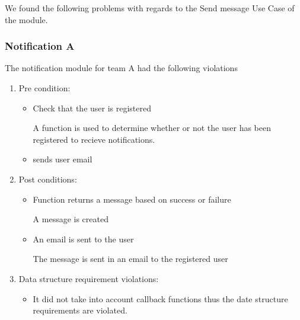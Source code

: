 
 We found the following problems with regards to the Send message Use Case of the module.
 \subsubsection*{Notification A}
 The notification module for team A had the following violations
 \begin{enumerate}
 	\item Pre condition:
 	\begin{itemize}
 		\item Check that the user is registered
			
		A function is used to determine whether or not the user has been registered to recieve notifications.
 		
		\item sends user email
 	\end{itemize}
	\item Post conditions:
	\begin{itemize}
		\item Function returns a message based on success or failure
			
		A message is created

		\item An email is sent to the user 
		
		The message is sent in an email to the registered user
 	
	\end{itemize}
	

	\item Data structure requirement violations:
 	\begin{itemize}
 		\item It did not take into account callback functions thus the date structure requirements are violated.
 		
 	\end{itemize}
 \end{enumerate}
